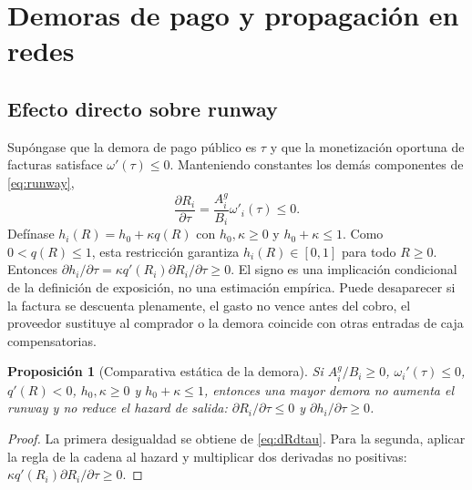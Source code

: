 \documentclass[11pt,a4paper]{article}
\newtheorem{proposition}[theorem]{Proposición}
\begin{document}
\section{Demoras de pago y propagación en redes}
\subsection{Efecto directo sobre runway}
Supóngase que la demora de pago público es $\tau$ y que la monetización oportuna de facturas satisface $\omega'(\tau)\leq0$. Manteniendo constantes los demás componentes de \eqref{eq:runway},
\begin{equation}
\frac{\partial R_i}{\partial\tau}=\frac{A_i^g}{B_i}\omega'_i(\tau)\leq0. \label{eq:dRdtau}
\end{equation}
Defínase $h_i(R)=h_0+\kappa q(R)$ con $h_0,\kappa\geq0$ y $h_0+\kappa\leq1$. Como $0<q(R)\leq1$, esta restricción garantiza $h_i(R)\in[0,1]$ para todo $R\geq0$. Entonces $\partial h_i/\partial\tau=\kappa q'(R_i)\partial R_i/\partial\tau\geq0$. El signo es una implicación condicional de la definición de exposición, no una estimación empírica. Puede desaparecer si la factura se descuenta plenamente, el gasto no vence antes del cobro, el proveedor sustituye al comprador o la demora coincide con otras entradas de caja compensatorias.

\begin{proposition}[Comparativa estática de la demora]
Si $A_i^g/B_i\geq0$, $\omega_i'(\tau)\leq0$, $q'(R)<0$, $h_0,\kappa\geq0$ y $h_0+\kappa\leq1$, entonces una mayor demora no aumenta el runway y no reduce el hazard de salida: $\partial R_i/\partial\tau\leq0$ y $\partial h_i/\partial\tau\geq0$.
\end{proposition}
\begin{proof}
La primera desigualdad se obtiene de \eqref{eq:dRdtau}. Para la segunda, aplicar la regla de la cadena al hazard y multiplicar dos derivadas no positivas: $\kappa q'(R_i)\partial R_i/\partial\tau\geq0$.\end{proof}
\end{document}

